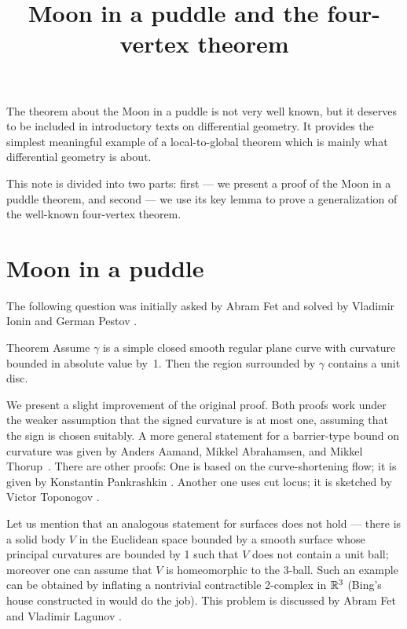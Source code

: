 \documentclass{article}
\begin{document}

\title{Moon in a puddle and the four-vertex theorem
}
\author{%
}
\date{}
\maketitle
\BgThispage
\thispagestyle{empty}

\newpage

The theorem about the Moon in a puddle is not very well known, but it deserves to be included in introductory texts on differential geometry.
It provides the simplest meaningful example of a local-to-global theorem which is mainly what differential geometry is about.

This note is divided into two parts:  first --- we present a proof of the Moon in a puddle theorem, and second --- we use its key lemma to prove a generalization of the well-known four-vertex theorem.

\section*{Moon in a puddle}

The following question was initially asked by Abram Fet and solved by Vladimir Ionin and German Pestov \cite{pestov-ionin}.

\begin{thm}{Theorem}\label{thm:moon-orginal}
Assume $\gamma$ is a simple closed smooth regular plane curve with curvature bounded in absolute value by~1.
Then the region surrounded by $\gamma$ contains a unit disc.
\end{thm}

We present %
a slight improvement of the original proof.
Both proofs work under the weaker assumption that the signed curvature is at most one, assuming that the sign is chosen suitably.
A more general statement for a barrier-type bound on curvature was given by Anders Aamand, Mikkel Abrahamsen, and Mikkel Thorup~\cite{aamand-abrahamsen-thoru}.
There are other proofs: 
One is based on the curve-shortening flow; it is given by Konstantin Pankrashkin  \cite{pankrashkin}.
Another one uses cut locus; it is sketched by Victor Toponogov %
\cite[Problem 1.7.19]{toponogov}.



Let us mention that an analogous statement for surfaces does not hold --- there is a solid body $V$ in the Euclidean space bounded by a smooth surface whose principal curvatures are bounded by 1 such that $V$ does not contain a unit ball; moreover one can assume that $V$ is homeomorphic to the 3-ball.
Such an example can be obtained by inflating a nontrivial contractible 2-complex in $\mathbb{R}^3$ 
(Bing's house constructed in \cite{bing} would do the job).
This problem is discussed by Abram Fet and Vladimir Lagunov \cite{lagunov-2,lagunov-fet}%
.
\end{document}
